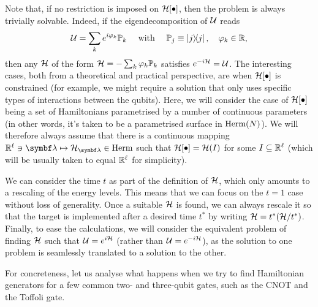 Note that, if no restriction is imposed on ${\mathcal{H}}[\bullet]$, then the problem is always trivially solvable. Indeed, if the eigendecomposition of ${\mathcal{U}}$ reads
\begin{equation}
    {\mathcal{U}}=\sum_k e^{i\varphi_k}{\mathbb{P}}_k
    \quad\text{ with }\quad
    {\mathbb{P}}_j\equiv\ketbra j,
    \quad \varphi_k\in{\mathbb{R}},
\end{equation}
then any ${\mathcal{H}}$ of the form ${\mathcal{H}} = -\sum_k \varphi_k\mathbb P_k$ satisfies $e^{-i{\mathcal{H}}}={\mathcal{U}}$.
The interesting cases, both from a theoretical and practical perspective, are when ${\mathcal{H}}[\bullet]$ is constrained (for example, we might require a solution that only uses specific types of interactions between the qubits).
Here, we will consider the case of ${\mathcal{H}}[\bullet]$ being a set of Hamiltonians parametrised by a number of continuous parameters (in other words, it's taken to be a parametrised surface in $\operatorname{Herm}(N)$).
We will therefore always assume that there is a continuous mapping $\RR^\ell\ni\bslambda\mapsto\calH_\bslambda\in\on{Herm}$ such that ${\mathcal{H}}[\bullet]={\mathcal{H}}(I)$ for some $I\subseteq{\mathbb{R}}^\ell$ (which will be usually taken to equal ${\mathbb{R}}^\ell$ for simplicity).

We can consider the time $t$ as part of the definition of ${\mathcal{H}}$, which only amounts to a rescaling of the energy levels. This means that we can focus on the $t=1$ case without loss of generality.
Once a suitable ${\mathcal{H}}$ is found, we can always rescale it so that the target is implemented after a desired time $t^*$ by writing ${\mathcal{H}}=t^*({\mathcal{H}}/t^*)$. Finally, to ease the calculations, we will consider the equivalent problem of finding ${\mathcal{H}}$ such that ${\mathcal{U}}=e^{i{\mathcal{H}}}$ (rather than ${\mathcal{U}}=e^{-i{\mathcal{H}}}$), as the solution to one problem is seamlessly translated to a solution to the other.

For concreteness, let us analyse what happens when we try to find Hamiltonian generators for a few common two- and three-qubit gates, such as the CNOT and the Toffoli gate.

